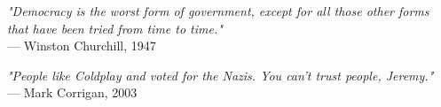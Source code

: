\begin{flushright}
\emph{"Democracy is the worst form of government, except for all those other forms that have been tried from time to time."}\\
— Winston Churchill, 1947
\end{flushright}
\vspace{2em}
\begin{flushright}
\emph{"People like Coldplay and voted for the Nazis. You can't trust people, Jeremy."}\\
— Mark Corrigan, 2003
\end{flushright}
